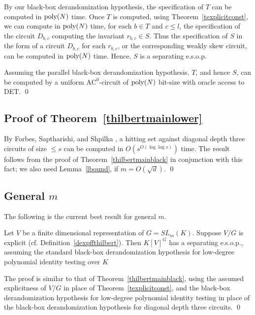 \documentclass[11pt]{article}
\begin{document}
By our black-box derandomization hypothesis, 
the specification of $T$ can be computed in ${\mbox {poly}}(N)$ time.
Once $T$ is computed, 
using  Theorem~\ref{texplicitconst}, we can compute in ${\mbox {poly}}(N)$ time,
for each $b\in T$ and $c \le l$,  the specification of the circuit $D_{b,c}$  computing 
the invariant $r_{b,c} \in S$. 
Thus the specification of $S$ in the form of a  circuit 
$D_{b,c}$ for  each $r_{b,c}$, or the corresponding weakly skew circuit, can be computed in ${\mbox {poly}}(N)$ time.
Hence, $S$ is a separating e.s.o.p.

Assuming the  parallel black-box derandomization hypothesis,
$T$,  and hence $S$,  can be computed by a uniform  $\mbox{AC}^0$-circuit of  ${\mbox {poly}}(N)$ bit-size with oracle access to DET.
\qed 



\subsection{Proof of  Theorem~\ref{thilbertmainlower}}

\proof 
By Forbes, Saptharishi, and Shpilka  \cite{fs1}, 
a hitting set against diagonal depth three circuits of size $\le s$ can be computed in
$O(s^{O(\log \log s)})$ time.
The result  follows from the proof of Theorem~\ref{thilbertmainblack} in conjunction
with this fact; we also need Lemma~\ref{lbound}, if $m=O(\sqrt{d})$. \qed 

\subsection{General $m$} \label{sgeneralm}
The following is  the current best result  for general $m$.

\begin{theorem} \label{tmarbitrary}
Let  $V$  be a finite dimensional  representation of $G=SL_m(K)$.
Suppose $V/G$ is explicit (cf. Definition~\ref{dexpffthilbert}).
Then $K[V]^G$ has a separating  e.s.o.p.,
 assuming
the standard black-box derandomization hypothesis for low-degree  polynomial identity testing   over $K$
\end{theorem} 


\proof  The proof is similar to that of Theorem~\ref{thilbertmainblack}, using the assumed 
explicitness of $V/G$ in place of Theorem~\ref{texplicitconst},
and the black-box derandomization hypothesis for low-degree 
polynomial identity testing in place of the black-box derandomization hypothesis for diagonal depth three circuits. 
\qed 
\end{document}
